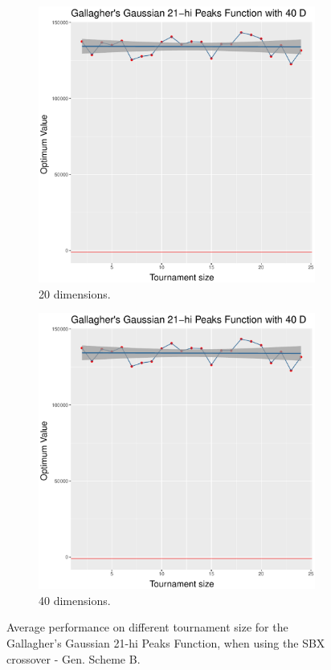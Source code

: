 \begin{figure}[t]
\begin{subfigure}[b]{0.33\textwidth}
		\includegraphics[width=\textwidth]{img/multimodal_2n2n_22_dim_40.pdf}
		\caption{20 dimensions.}
	\end{subfigure}
	\begin{subfigure}[b]{0.33\textwidth}
		\centering
		\includegraphics[width=\textwidth]{img/multimodal_2n2n_22_dim_40.pdf}
		\caption{40 dimensions.}
	\end{subfigure}
	\caption{Average performance on different tournament size for the Gallagher's Gaussian 21-hi Peaks Function, when using the SBX crossover - Gen. Scheme B.}
	\label{sbx-22-B}
\end{figure}

